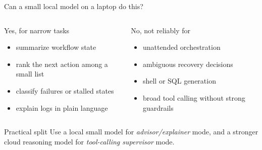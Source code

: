 \documentclass[aspectratio=169,11pt]{beamer}
\begin{document}
\begin{frame}{Can a small local model on a laptop do this?}
  \begin{columns}[T]
    \begin{block}{Yes, for narrow tasks}
      \begin{itemize}
        \item summarize workflow state
        \item rank the next action among a small list
        \item classify failures or stalled states
        \item explain logs in plain language
      \end{itemize}
    \end{block}

    \begin{block}{No, not reliably for}
      \begin{itemize}
        \item unattended orchestration
        \item ambiguous recovery decisions
        \item shell or SQL generation
        \item broad tool calling without strong guardrails
      \end{itemize}
    \end{block}
  \end{columns}

  \vspace{0.4em}
  \begin{block}{Practical split}
    Use a local small model for \emph{advisor/explainer} mode, and a stronger
    cloud reasoning model for \emph{tool-calling supervisor} mode.
  \end{block}
\end{frame}
\end{document}
